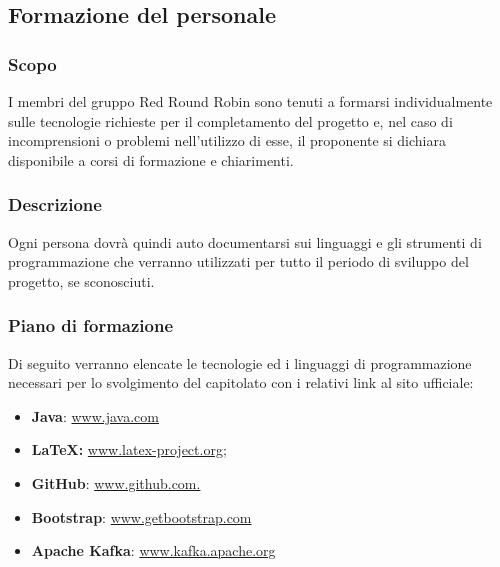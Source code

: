 \subsection{Formazione del personale}

	\subsubsection{Scopo}
		I membri del gruppo Red Round Robin sono tenuti a formarsi individualmente sulle tecnologie richieste per il completamento del progetto e, nel caso di incomprensioni o problemi nell'utilizzo di esse, il proponente si dichiara disponibile a corsi di formazione e chiarimenti.
		
	\subsubsection{Descrizione}
		Ogni persona dovrà quindi auto documentarsi sui linguaggi e gli strumenti di programmazione che verranno utilizzati per tutto il periodo di sviluppo del progetto, se sconosciuti.
		
	\subsubsection{Piano di formazione}
		Di seguito verranno elencate le tecnologie ed i linguaggi di programmazione necessari per lo svolgimento del capitolato con i relativi link al sito ufficiale:
		\begin{itemize}
			\item \textbf{Java}: \href{https://www.java.com/}{www.java.com}
			\item \textbf{\LaTeX{}:} \href{www.latex-project.org}{www.latex-project.org;}
			\item \textbf{GitHub}: \href{www.github.com}{www.github.com.}
			\item \textbf{Bootstrap}: \href{https://getbootstrap.com/}{www.getbootstrap.com}
			\item \textbf{Apache Kafka}: \href{https://kafka.apache.org/}{www.kafka.apache.org}
		\end{itemize}

